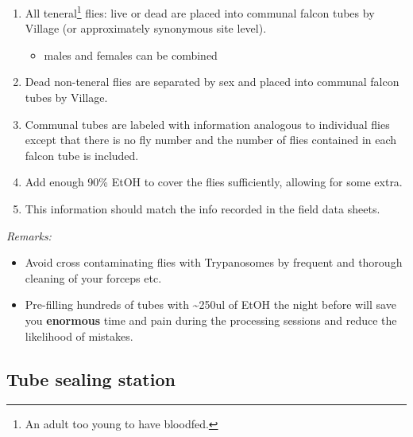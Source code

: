 \documentclass[letterpaper]{scrreprt}
\begin{document}
\begin{enumerate}
\def\labelenumi{\arabic{enumi}.}
\itemsep1pt\parskip0pt
\item
  All teneral\footnote{An adult too young to have bloodfed.} flies: live
  or dead are placed into communal falcon tubes by Village (or
  approximately synonymous site level).

  \begin{itemize}
  \itemsep1pt\parskip0pt
  \item
    males and females can be combined
  \end{itemize}
\item
  Dead non-teneral flies are separated by sex and placed into communal
  falcon tubes by Village.
\item
  Communal tubes are labeled with information analogous to individual
  flies except that there is no fly number and the number of flies
  contained in each falcon tube is included.
\item
  Add enough 90\% EtOH to cover the flies sufficiently, allowing for
  some extra.
\item
  This information should match the info recorded in the field data
  sheets.
\end{enumerate}

\emph{Remarks:}

\begin{itemize}
\itemsep1pt\parskip0pt
\item
  Avoid cross contaminating flies with Trypanosomes by frequent and
  thorough cleaning of your forceps etc.
\item
  Pre-filling hundreds of tubes with \textasciitilde{}250ul of EtOH the
  night before will save you \textbf{enormous} time and pain during the
  processing sessions and reduce the likelihood of mistakes.
\end{itemize}

\subsection{Tube sealing station}\label{tube-sealing-station}
\end{document}
